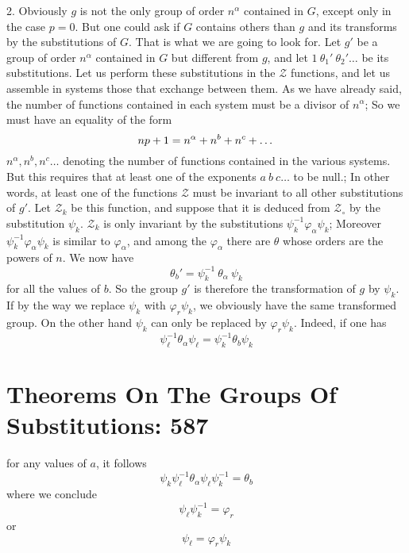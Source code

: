\documentclass[11pt,fancy]{elegantbook}
\begin{document}
2.
Obviously $g$ is not the only group of order $n^\alpha$ contained in $G$, except only in the case $p = 0$. But one could ask if $G$ contains others than $g$ and its transforms by the substitutions of $G$. That is what we are going to look for. Let $g'$ be a group of order $n^\alpha$ contained in $G$ but different from $g$, and let $1 \ \theta_1' \ \theta_2'\dots$ be its substitutions. Let us perform these substitutions in the $\mathcal{Z}$ functions, and let us assemble in systems those that exchange between them. As we have already said, the number of functions contained in each system must be a divisor of $n^\alpha$; So we must have an equality of the form 
\begin{equation}
    np + 1 = n^\alpha + n^b + n^c + \dots \\ 
\end{equation}
$n^\alpha, n^b, n^c \dots$
denoting the number of functions contained in the various systems. But this requires that at least one of the exponents $a \ b \ c \dots$ to be null.; In other words, at least one of the functions $\mathcal{Z}$ must be invariant to all other substitutions of $g'$. Let $\mathcal{Z}_k$ be this function, and suppose that it is deduced from $\mathcal{Z_\circ}$ by the substitution $\psi_k$. $\mathcal{Z}_k$ is only invariant by the substitutions $\psi_k^{-1}\varphi_\alpha\psi_k$; Moreover $\psi_k^{-1}\varphi_\alpha\psi_k$ is similar to $\varphi_\alpha$, and among the $\varphi_\alpha$ there are $\theta$ whose orders are the powers of $n$. We now have \begin{equation}
    \theta_b{'} = \psi_k^{-1} \ \theta_\alpha \  \psi_k
\end{equation}
for all the values of $b$. So the group $g'$ is therefore the transformation of $g$ by $\psi_k$.
If by the way we replace $\psi_k$ with $\varphi_r\psi_k$, we obviously have the same transformed group. On the other hand $\psi_k$ can only be replaced by $\varphi_r\psi_k$. Indeed, if one has
\begin{equation}
    \psi_\ell^{-1}\theta_\alpha\psi_\ell = \psi_k^{-1}\theta_b\psi_k 
\end{equation}


\section{Theorems On The Groups Of Substitutions: 587}

for any values of $a$, it follows 
\begin{equation}
    \psi_k\psi_\ell^{-1}\theta_\alpha\psi_\ell\psi_k^{-1} = \theta_b
\end{equation}
where we conclude 
\begin{equation}
    \psi_\ell\psi_k^{-1}=\varphi_r 
\end{equation}
or 
\begin{equation}
    \psi_\ell=\varphi_r\psi_k
\end{equation}
\end{document}
